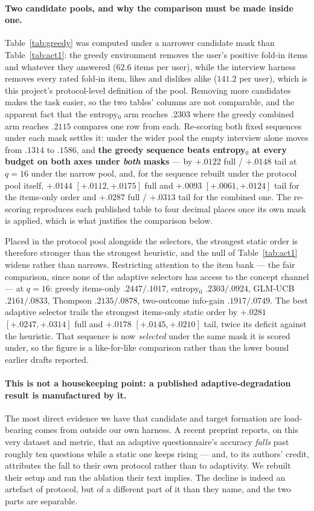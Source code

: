 \documentclass[11pt]{article}
\begin{document}
\paragraph{Two candidate pools, and why the comparison must be made inside one.}
Table~\ref{tab:greedy} was computed under a narrower candidate mask than Table~\ref{tab:act1}: the
greedy environment removes the user's positive fold-in items and whatever they answered
($62.6$ items per user), while the interview harness removes every rated fold-in item, likes and
dislikes alike ($141.2$ per user), which is this project's protocol-level definition of the pool.
Removing more candidates makes the task easier, so the two tables' columns are not comparable, and
the apparent fact that the entropy$_0$ arm reaches $.2303$ where the greedy combined arm reaches
$.2115$ compares one row from each. Re-scoring both fixed sequences under each mask settles it:
under the wider pool the empty interview alone moves from $.1314$ to $.1586$, and
\textbf{the greedy sequence beats entropy$_0$ at every budget on both axes under \emph{both} masks}
--- by $+.0122$ full / $+.0148$ tail at $q{=}16$ under the narrow pool, and, for the sequence
rebuilt under the protocol pool itself, $+.0144$ $[+.0112,+.0175]$ full and $+.0093$
$[+.0061,+.0124]$ tail for the items-only order and $+.0287$ full / $+.0313$ tail for the combined
one. The re-scoring reproduces each published table to four decimal places once its own mask is
applied, which is what justifies the comparison below.

Placed in the protocol pool alongside the selectors, the strongest static order is therefore
stronger than the strongest heuristic, and the null of Table~\ref{tab:act1} widens rather than
narrows. Restricting attention to the item bank --- the fair comparison, since none of the adaptive
selectors has access to the concept channel --- at $q{=}16$: greedy items-only $.2447/.1017$,
entropy$_0$ $.2303/.0924$, GLM-UCB $.2161/.0833$, Thompson $.2135/.0878$, two-outcome info-gain $.1917/.0749$. The
best adaptive selector trails the strongest items-only static order by $+.0281$
$[+.0247,+.0314]$ full and $+.0178$ $[+.0145,+.0210]$ tail, twice its deficit against the
heuristic. That sequence is now \emph{selected} under the same mask it is scored under, so the
figure is a like-for-like comparison rather than the lower bound earlier drafts reported.

\paragraph{This is not a housekeeping point: a published adaptive-degradation result is
manufactured by it.} The most direct evidence we have that candidate and target formation are
load-bearing comes from outside our own harness. A recent preprint reports, on this very dataset
and metric, that an adaptive questionnaire's accuracy \emph{falls} past roughly ten questions while
a static one keeps rising --- and, to its authors' credit, attributes the fall to their own protocol
rather than to adaptivity. We rebuilt their setup and ran the ablation their text implies. The
decline is indeed an artefact of protocol, but of a different part of it than they name, and the
two parts are separable.
\end{document}
